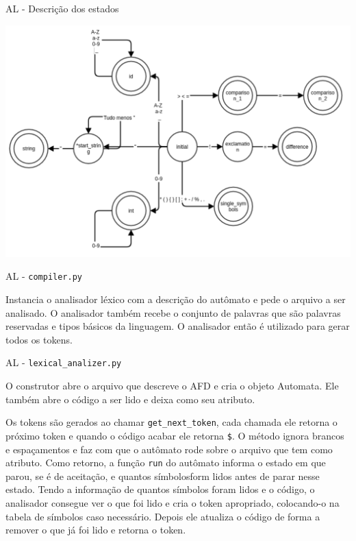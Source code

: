 \documentclass[10pt]{beamer}
\begin{document}
\begin{frame}{AL - Descrição dos estados}

    \includegraphics[width=\textwidth,height=\textheight,keepaspectratio]{automata_description.pdf}

\end{frame}

\begin{frame}{AL - \texttt{compiler.py}}

    Instancia o analisador léxico com a descrição do autômato e pede o arquivo
    a ser analisado. O analisador também recebe o conjunto de palavras que são
    palavras reservadas e tipos básicos da linguagem. O analisador então é
    utilizado para gerar todos os tokens.

\end{frame}

\begin{frame}{AL - \texttt{lexical\_analizer.py}}

    O construtor abre o arquivo que descreve o AFD e cria o objeto Automata.
    Ele também abre o código a ser lido e deixa como seu atributo.

    Os tokens são gerados ao chamar \texttt{get\_next\_token}, cada chamada ele
    retorna o próximo token e quando o código acabar ele retorna \texttt{\$}. O
    método ignora brancos e espaçamentos e faz com que o autômato rode sobre o
    arquivo que tem como atributo. Como retorno, a função \texttt{run} do
    autômato informa o estado em que parou, se é de aceitação, e quantos
    símbolosform lidos antes de parar nesse estado. Tendo a informação de
    quantos símbolos foram lidos e o código, o analisador consegue ver o que
    foi lido e cria o token apropriado, colocando-o na tabela de símbolos caso
    necessário. Depois ele atualiza o código de forma a remover o que já foi
    lido e retorna o token.

\end{frame}
\end{document}
